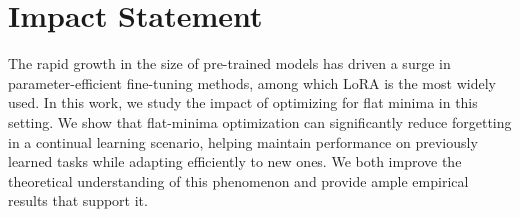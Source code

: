 \documentclass{article}
\theoremstyle{plain}
\theoremstyle{definition}
\theoremstyle{remark}
\begin{document}






\section*{Impact Statement}




The rapid growth in the size of pre-trained models has driven a surge in parameter-efficient fine-tuning methods, among which LoRA is the most widely used. In this work, we study the impact of optimizing for flat minima in this setting. We show that flat-minima optimization can significantly reduce forgetting in a continual learning scenario, helping maintain performance on previously learned tasks while adapting efficiently to new ones. We both improve the theoretical understanding of this phenomenon and provide ample empirical results that support it.
\end{document}
